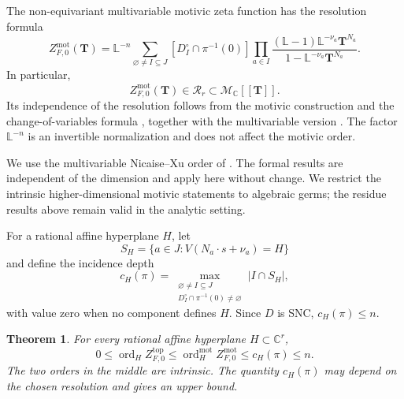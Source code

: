 \documentclass[12pt]{amsart}
\numberwithin{equation}{section}
\theoremstyle{plain}
\newtheorem{theorem}{Theorem}[section]
\theoremstyle{definition}
\theoremstyle{remark}
\theoremstyle{definition}
\DeclareMathOperator{\ord}{ord}
\newcommand{\C}{\mathbb C}
\newcommand{\D}{\mathscr D}
\newcommand{\Lef}{\mathbb L}
\newcommand{\Mmot}{\mathcal M_{\mathbb C}}
\begin{document}
The non-equivariant multivariable motivic zeta function has the resolution formula
\begin{equation}\label{eq:higher-motivic-resolution}
Z^{\mathrm{mot}}_{F,0}(\mathbf T)
=
\Lef^{-n}
\sum_{\varnothing\ne I\subseteq J}
[D_I^\circ\cap\pi^{-1}(0)]
\prod_{a\in I}
\frac{(\Lef-1)\Lef^{-\nu_a}\mathbf T^{N_a}}
{1-\Lef^{-\nu_a}\mathbf T^{N_a}}.
\end{equation}
In particular,
\[
Z^{\mathrm{mot}}_{F,0}(\mathbf T)\in\mathscr R_r\subset\Mmot[\![\mathbf T]\!].
\]
Its independence of the resolution follows from the motivic construction and the change-of-variables formula \cite[Theorem~2.2.1]{DenefLoeser1998}, together with the multivariable version \cite[D\'efinition~4.1.1 and Th\'eor\`eme~4.1.2]{Guibert2002}. The factor $\Lef^{-n}$ is an invertible normalization and does not affect the motivic order.

We use the multivariable Nicaise--Xu order of . The formal results  are independent of the dimension and apply here without change. We restrict the intrinsic higher-dimensional motivic statements to algebraic germs; the residue results above remain valid in the analytic setting.

For a rational affine hyperplane $H$, let
\begin{equation*}
S_H=\{a\in J:V(N_a\cdot s+\nu_a)=H\}
\end{equation*}
and define the incidence depth
\begin{equation}\label{eq:motivic-incidence-depth}
 c_H(\pi)=\max_{\substack{\varnothing\ne I\subseteq J\\D_I^\circ\cap\pi^{-1}(0)\ne\varnothing}}|I\cap S_H|,
\end{equation}
with value zero when no component defines $H$. Since $D$ is SNC, $c_H(\pi)\leq n$.

\begin{theorem}\label{thm:higher-motivic-order-bounds}
For every rational affine hyperplane $H\subset\C^r$,
\begin{equation}\label{eq:higher-motivic-order-bounds}
 0\leq\ord_HZ^{\mathrm{top}}_{F,0}\leq\ord_H^{\mathrm{mot}}Z^{\mathrm{mot}}_{F,0}\leq c_H(\pi)\leq n.
\end{equation}
The two orders in the middle are intrinsic. The quantity $c_H(\pi)$ may depend on the chosen resolution and gives an upper bound.
\end{theorem}
\end{document}
